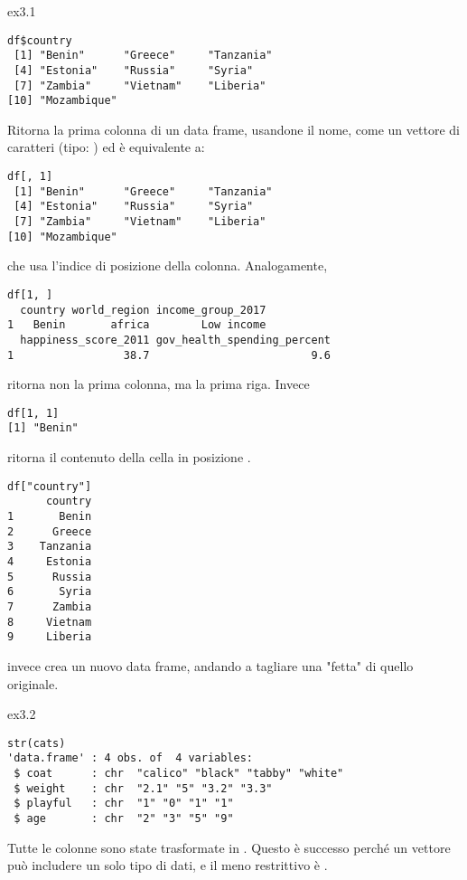 \begin{solution}{ex3.1}

\begin{lstlisting}[style=Rstyle]
df$country
 [1] "Benin"      "Greece"     "Tanzania"  
 [4] "Estonia"    "Russia"     "Syria"     
 [7] "Zambia"     "Vietnam"    "Liberia"   
[10] "Mozambique"
\end{lstlisting}

\noindent Ritorna la prima colonna di un data frame, usandone il nome, come un vettore di caratteri (tipo: ) ed \`e equivalente a:

\begin{lstlisting}[style=Rstyle]
df[, 1]
 [1] "Benin"      "Greece"     "Tanzania"  
 [4] "Estonia"    "Russia"     "Syria"     
 [7] "Zambia"     "Vietnam"    "Liberia"   
[10] "Mozambique"
\end{lstlisting}
%
che usa l'indice di posizione della colonna. Analogamente,

\begin{lstlisting}[style=Rstyle]
df[1, ]
  country world_region income_group_2017
1   Benin       africa        Low income
  happiness_score_2011 gov_health_spending_percent
1                 38.7                         9.6
\end{lstlisting}
%
ritorna non la prima colonna, ma la prima riga. Invece

\begin{lstlisting}[style=Rstyle]
df[1, 1]
[1] "Benin"
\end{lstlisting}
%
ritorna il contenuto della cella in posizione .

\begin{lstlisting}[style=Rstyle]
df["country"]
      country
1       Benin
2      Greece
3    Tanzania
4     Estonia
5      Russia
6       Syria
7      Zambia
8     Vietnam
9     Liberia
\end{lstlisting}
%
invece crea un nuovo data frame, andando a tagliare una "fetta" di quello originale.

\end{solution}

\vspace{0.5cm}

\begin{solution}{ex3.2}

\begin{lstlisting}[style=Rstyle]
str(cats)
'data.frame' : 4 obs. of  4 variables:
 $ coat      : chr  "calico" "black" "tabby" "white"
 $ weight    : chr  "2.1" "5" "3.2" "3.3"
 $ playful   : chr  "1" "0" "1" "1"
 $ age       : chr  "2" "3" "5" "9"
\end{lstlisting}
%
Tutte le colonne sono state trasformate in . Questo \`e successo perch\'e un vettore pu\`o includere un solo tipo di dati, e il meno restrittivo \`e  .

\end{solution}


